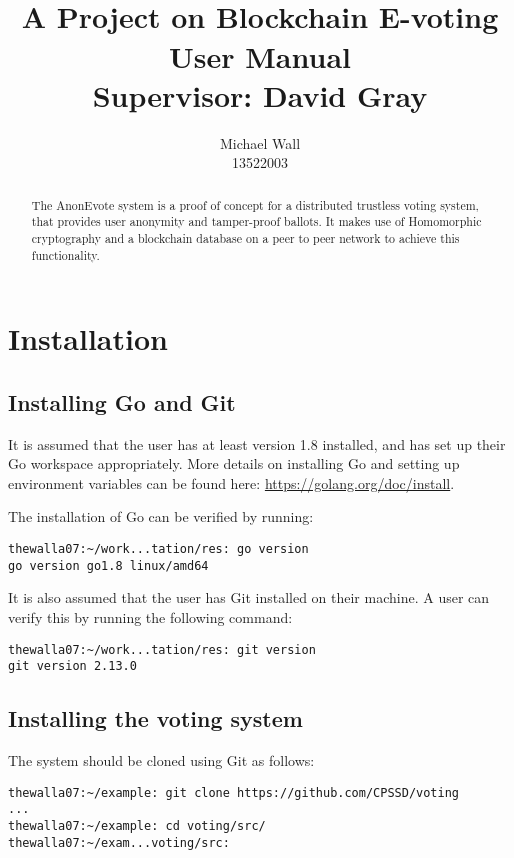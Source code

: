 \documentclass[a4paper,12pt]{article}
\title{\proj{}\\A Project on Blockchain E-voting\\User Manual\\Supervisor: David Gray}
\author{Michael Wall\\13522003}
\newcommand{\proj}{AnonEvote}
\begin{document}
\maketitle
\begin{abstract}
    The \proj{} system is a proof of concept for a distributed trustless voting system, that provides user anonymity and tamper-proof ballots. It makes use of Homomorphic cryptography and a blockchain database on a peer to peer network to achieve this functionality.
\end{abstract}

\newpage

\tableofcontents

\newpage

\section{Installation}
\subsection{Installing Go and Git}
It is assumed that the user has at least version 1.8 installed, and has set up their Go workspace appropriately. More details on installing Go and setting up environment variables can be found here: \url{https://golang.org/doc/install}.

The installation of Go can be verified by running:
\begin{verbatim}
thewalla07:~/work...tation/res: go version
go version go1.8 linux/amd64
\end{verbatim}

It is also assumed that the user has Git installed on their machine. A user can verify this by running the following command:
\begin{verbatim}
thewalla07:~/work...tation/res: git version
git version 2.13.0
\end{verbatim}

\subsection{Installing the voting system}
The system should be cloned using Git as follows:

\begin{verbatim}
thewalla07:~/example: git clone https://github.com/CPSSD/voting
...
thewalla07:~/example: cd voting/src/
thewalla07:~/exam...voting/src:
\end{verbatim}
\end{document}
